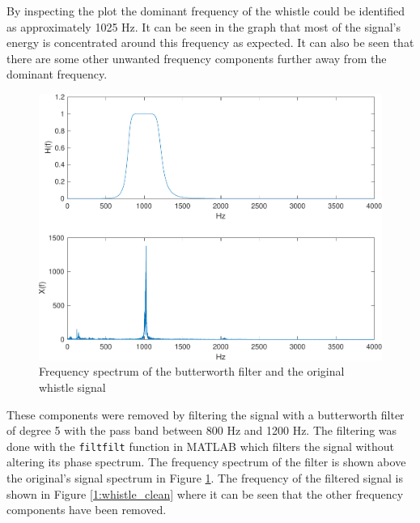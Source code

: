 \documentclass{IEEEtran}
\newcommand{\code}[1]{\texttt{#1}}
\begin{document}
By inspecting the plot the dominant frequency of the whistle could be
identified as approximately 1025 Hz. It can be seen in the graph that
most of the signal's energy is concentrated around this frequency as
expected. It can also be seen that there are some other unwanted
frequency components further away from the dominant frequency.

\begin{figure}[h]
  \centering
  \captionsetup{justification=centering}

  \includegraphics[width=0.8\columnwidth]{pictures/whistle_filter.pdf}
  \caption{Frequency spectrum of the butterworth filter and the original
  whistle signal}
  \label{1:whistle_filter}
\end{figure}

These components were removed by filtering the signal with a butterworth
filter of degree 5 with the pass band between 800 Hz and 1200 Hz. The
filtering was done with the \code{filtfilt} function in MATLAB which filters
the signal without altering its phase spectrum. The frequency spectrum
of the filter is shown above the original's signal spectrum in Figure
\ref{1:whistle_filter}. The frequency of the filtered signal is shown
in Figure \ref{1:whistle_clean} where it can be seen that the other
frequency components have been removed.
\end{document}
